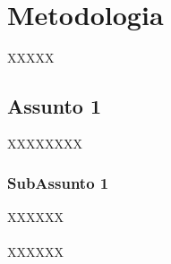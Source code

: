 \chapter{Metodologia}
\label{Cap:MateriaisMetodos}


XXXXX


\section{Assunto 1}

XXXXXXXX


\subsection{SubAssunto 1}

XXXXXX
\\\\
XXXXXX


